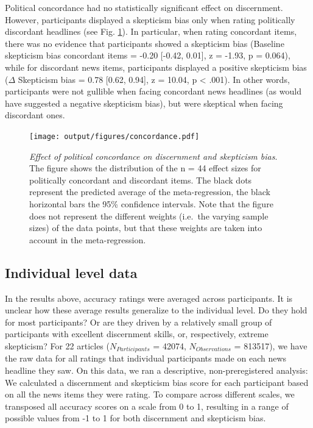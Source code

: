 \documentclass[
  man]{apa6}
\begin{document}
Political concordance had no statistically significant effect on discernment. However, participants displayed a skepticism bias only when rating politically discordant headlines (see Fig. \ref{fig:concordance}). In particular, when rating concordant items, there was no evidence that participants showed a skepticism bias (Baseline skepticism bias concordant items = -0.20 {[}-0.42, 0.01{]}, z = -1.93, p = 0.064), while for discordant news items, participants displayed a positive skepticism bias (\(\Delta\) Skepticism bias = 0.78 {[}0.62, 0.94{]}, z = 10.04, p \textless{} .001). In other words, participants were not gullible when facing concordant news headlines (as would have suggested a negative skepticism bias), but were skeptical when facing discordant ones.



\begin{figure}
\centering
\texttt{[image: output/figures/concordance.pdf]}
\caption{\label{fig:concordance}\emph{Effect of political concordance on discernment and skepticism bias}. The figure shows the distribution of the n = 44 effect sizes for politically concordant and discordant items. The black dots represent the predicted average of the meta-regression, the black horizontal bars the 95\% confidence intervals. Note that the figure does not represent the different weights (i.e.~the varying sample sizes) of the data points, but that these weights are taken into account in the meta-regression.}
\end{figure}

\subsection{Individual level data}\label{individual-level-data}

In the results above, accuracy ratings were averaged across participants. It is unclear how these average results generalize to the individual level. Do they hold for most participants? Or are they driven by a relatively small group of participants with excellent discernment skills, or, respectively, extreme skepticism? For 22 articles (\(N_{Participants}\) = 42074, \(N_{Observations}\) = 813517), we have the raw data for all ratings that individual participants made on each news headline they saw. On this data, we ran a descriptive, non-preregistered analysis: We calculated a discernment and skepticism bias score for each participant based on all the news items they were rating. To compare across different scales, we transposed all accuracy scores on a scale from 0 to 1, resulting in a range of possible values from -1 to 1 for both discernment and skepticism bias.
\end{document}
